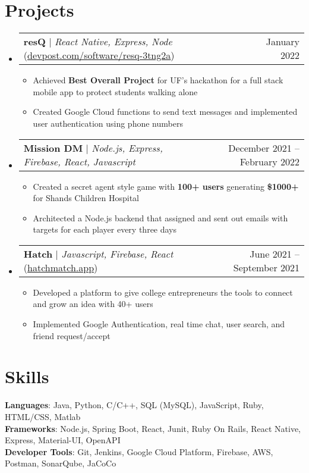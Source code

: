 \documentclass[letterpaper,11pt]{article}
\makeatletter
\newcommand{\resumeItem}[1]{
  \item\small{
    {#1 \vspace{-2pt}}
  }
}
\newcommand{\resumeProjectHeading}[2]{
    \item
    \begin{tabular*}{0.97\textwidth}{l@{\extracolsep{\fill}}r}
      \small#1 & #2 \\
    \end{tabular*}\vspace{-7pt}
}
\newcommand{\resumeSubHeadingListStart}{\begin{itemize}[leftmargin=0.15in, label={}]}
\newcommand{\resumeSubHeadingListEnd}{\end{itemize}\vspace{-12pt}}
\newcommand{\resumeItemListStart}{\begin{itemize}}
\newcommand{\resumeItemListEnd}{\end{itemize}\vspace{-5pt}}
\makeatother
\begin{document}
\section{Projects} 
    \resumeSubHeadingListStart
     \resumeProjectHeading
          {\textbf{resQ} $|$ \emph{React Native, Express, Node} (\href{https://devpost.com/software/resq-3tng2a}{\underline{devpost.com/software/resq-3tng2a}}) }{January 2022 } 
          \resumeItemListStart
            \resumeItem {Achieved \textbf{Best Overall Project} for UF's hackathon for a full stack mobile app to protect students walking alone}
            \resumeItem{Created Google Cloud functions to send text messages and implemented user authentication using phone numbers}
          \resumeItemListEnd
          
        \resumeProjectHeading
          {\textbf{Mission DM} $|$ \emph{Node.js, Express, Firebase, React, Javascript}}{December 2021 -- February 2022 } 
          \resumeItemListStart
            \resumeItem{Created a secret agent style game with \textbf{100+ users} generating \textbf{\$1000+} for Shands Children Hospital}
            \resumeItem{Architected a Node.js backend that assigned and sent out emails with targets for each player every three days}
          \resumeItemListEnd
          
      \resumeProjectHeading
          {\textbf{Hatch} $|$ \emph{Javascript, Firebase, React} (\href{https://hatchmatch.app}{\underline{hatchmatch.app}}) }{June 2021 -- September 2021 } 
          \resumeItemListStart
            \resumeItem{Developed a platform to give college entrepreneurs the tools to connect and grow an idea with 40+ users}
            \resumeItem{Implemented Google Authentication, real time chat, user search, and friend request/accept}
          \resumeItemListEnd
     
          
    \resumeSubHeadingListEnd


\section{Skills}
 \begin{itemize}[leftmargin=0.2in, label={}]
    \small{\item{
     \textbf{Languages}{: Java, Python, C/C++, SQL (MySQL), JavaScript, Ruby, HTML/CSS, Matlab} \\
     \textbf{Frameworks}{: Node.js, Spring Boot, React, Junit, Ruby On Rails, React Native, Express, Material-UI, OpenAPI} \\
     \textbf{Developer Tools}{: Git, Jenkins, Google Cloud Platform, Firebase, AWS, Postman, SonarQube, JaCoCo } \\
    }}
 \end{itemize} \vspace{-17pt}
\end{document}
